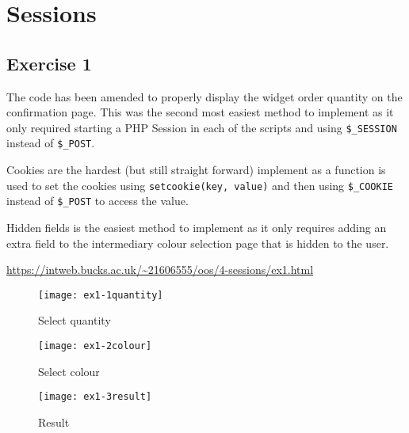 \chapter{Sessions}
\graphicspath{{4-sessions/images/}}

\section{Exercise 1}

The code has been amended to properly display the widget order quantity on the confirmation page. This was the second most easiest method to implement as it only required starting a PHP Session in each of the scripts and using \texttt{\$\_SESSION} instead of \texttt{\$\_POST}.

Cookies are the hardest (but still straight forward) implement as a function is used to set the cookies using \texttt{setcookie(key, value)} and then using \texttt{\$\_COOKIE} instead of \texttt{\$\_POST} to access the value.

Hidden fields is the easiest method to implement as it only requires adding an extra field to the intermediary colour selection page that is hidden to the user.

\url{https://intweb.bucks.ac.uk/~21606555/oos/4-sessions/ex1.html}

\clearpage
\captionsetup{type=figure}


\captionsetup{type=figure}


\captionsetup{type=figure}


\begin{figure}[H]
  \caption{Select quantity}
  \centering
  \texttt{[image: ex1-1quantity]}
\end{figure}

\begin{figure}[H]
  \caption{Select colour}
  \centering
  \texttt{[image: ex1-2colour]}
\end{figure}

\begin{figure}[H]
  \caption{Result}
  \centering
  \texttt{[image: ex1-3result]}
\end{figure}

\clearpage
